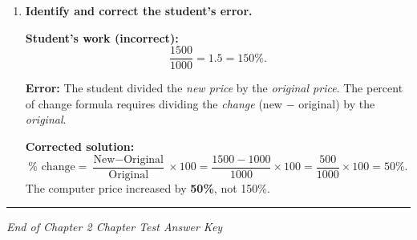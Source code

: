 \documentclass[11pt]{article}
\begin{document}
\begin{enumerate}[leftmargin=*, label=\textbf{\arabic*.}]
  \textbf{Answer: The 50-pack is the better buy (\$0.26/CD vs.\ \$0.317/CD).}

\vspace{0.3cm}
\item \textbf{Identify and correct the student's error.}

  \textbf{Student's work (incorrect):}
  \[
    \frac{1500}{1000} = 1.5 = 150\%.
  \]

  \textbf{Error:} The student divided the \textit{new price} by the
  \textit{original price}. The percent of change formula requires dividing
  the \textit{change} (new $-$ original) by the \textit{original}.

  \textbf{Corrected solution:}
  \[
    \% \text{ change} = \frac{\text{New} - \text{Original}}{\text{Original}} \times 100
    = \frac{1500 - 1000}{1000} \times 100 = \frac{500}{1000} \times 100 = 50\%.
  \]
  The computer price increased by \textbf{50\%}, not 150\%.

\end{enumerate}

\vspace{0.5cm}
\hrule
\begin{center}
  \textit{End of Chapter 2 Chapter Test Answer Key}
\end{center}
\end{document}

